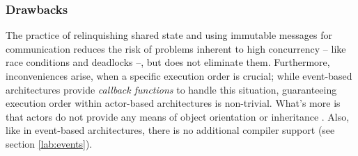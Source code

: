 \subsubsection*{Drawbacks}
The practice of relinquishing shared state and using immutable messages for communication reduces the risk of problems inherent to high concurrency -- like race conditions and deadlocks --, but does not eliminate them. Furthermore, inconveniences arise, when a specific execution order is crucial; while event-based architectures provide \textit{callback functions} to handle this situation, guaranteeing execution order within actor-based architectures is non-trivial. What's more is that actors do not provide any means of object orientation or inheritance \cite{Mackay97}. Also, like in event-based architectures, there is no additional compiler support (see section \ref{lab:events}).
